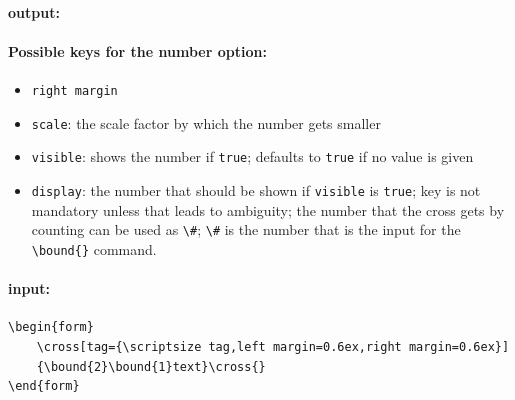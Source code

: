 \documentclass[parskip=half-]{scrartcl}
\begin{document}
\makeatletter
\def\form@print@inject{
    \put(\form@array@get{form@cross@leftpos}[0],\dimexpr\form@bottom+\form@array@get{form@cross@toppos}[0]-0.6pt){\scalebox{0.1}{\color{red}\line(-1,0){10\dimexpr\form@array@get{form@margin@number@right}[0]}}}
    \put(\dimexpr\form@array@get{form@cross@leftpos}[0]-\form@array@get{form@margin@number@right}[0],\dimexpr\form@bottom+\form@array@get{form@cross@toppos}[0]-1.1pt){\scalebox{0.05}{\color{red}right margin}}
}
\makeatother

\paragraph{output:}
\begin{center}
    \scalebox{10}{
        \begin{form}
            \cross[number={visible,right margin=0.5ex}]{}
        \end{form}
    }
\end{center}

\paragraph{Possible keys for the number option:}
\begin{itemize}
    \item \verb|right margin|
    \item \verb|scale|: the scale factor by which the number gets smaller
    \item \verb|visible|: shows the number if \verb|true|; defaults to \verb|true| if no value is given
    \item \verb|display|: the number that should be shown if \verb|visible| is \verb|true|; key is not mandatory unless that leads to ambiguity; the number that the cross gets by counting can be used as \verb|\#|; \verb|\#| is the number that is the input for the \verb|\bound{}| command.
\end{itemize}

\paragraph{input:}
\begin{verbatim}
\begin{form}
    \cross[tag={\scriptsize tag,left margin=0.6ex,right margin=0.6ex}]
    {\bound{2}\bound{1}text}\cross{}
\end{form}
\end{verbatim}
\end{document}
